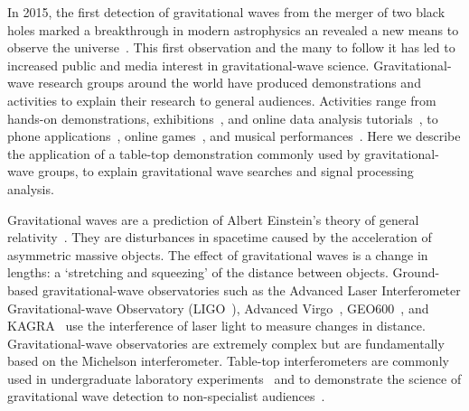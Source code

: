 \documentclass[paper-main.tex]{subfiles}
\begin{document}
In 2015, the first detection of gravitational waves from the merger of two black holes marked a breakthrough in modern astrophysics an revealed a new means to observe the universe~\cite{GW150914}.
This first observation and the many to follow it has led to increased public and media interest in gravitational-wave science. 
Gravitational-wave research groups around the world have produced demonstrations and activities to explain their research to general audiences. 
Activities range from hands-on demonstrations, exhibitions~\cite{TTExhibit:2020,LIGOScienceEducationCentre:online,GravityDiscoveryCentre:online}, and online data analysis tutorials~\cite{GWOSC:online,LOSC:2015}, to phone applications~\cite{LaserLabs:online,SciVR:online,chirp:online}, online games~\cite{BlackHoleHunter:online}, and musical performances~\cite{ArthurJeffesMusic:online,GravitySynthLeonTrimble:online}. %
Here we describe the application of a table-top demonstration commonly used by gravitational-wave groups, to explain gravitational wave searches and signal processing analysis. 


Gravitational waves are a prediction of Albert Einstein's theory of general relativity~\cite{Einstein:1916}. 
They are disturbances in spacetime caused by the acceleration of asymmetric massive objects. 
The effect of gravitational waves is a change in lengths: a `stretching and squeezing' of the distance between objects. 
Ground-based gravitational-wave observatories such as the Advanced Laser Interferometer Gravitational-wave Observatory (LIGO~\cite{AdvancedLIGO:2015}), Advanced Virgo~\cite{AdvancedVirgo:2015}, GEO600~\cite{GEO600:2010}, and KAGRA~\cite{KAGRA:2013} use the interference of laser light to measure changes in distance. 
Gravitational-wave observatories are extremely complex but are fundamentally based on the Michelson interferometer. 
Table-top interferometers are commonly used in undergraduate laboratory experiments~\cite{UgoliniEtAl:2019} and to demonstrate the science of gravitational wave detection to non-specialist audiences~\cite{ThorLabsIFO,NikhefIFO,AMIGO:online,TTExhibit:2020,LIGOIFOGlue,LIGOIFOMagnets}.
\end{document}
